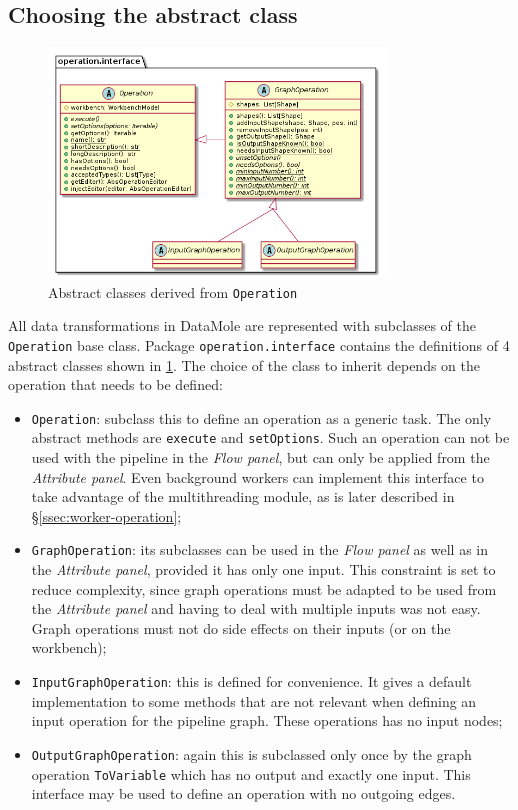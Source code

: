 \subsection{Choosing the abstract class}
\begin{figure}
	\centering
	\includegraphics[width=0.8\textwidth]{../uml/operation}
	\caption{Abstract classes derived from \texttt{Operation}}
	\label{fig:operationuml-dev}
\end{figure}
All data transformations in DataMole are represented with subclasses of the \texttt{Operation} base class. Package \texttt{operation.interface} contains the definitions of 4 abstract classes shown in \cref{fig:operationuml-dev}. 
The choice of the class to inherit depends on the operation that needs to be defined:
\begin{itemize}
	\item \texttt{Operation}: subclass this to define an operation as a generic task. The only abstract methods are \texttt{execute} and \texttt{setOptions}. Such an operation can not be used with the pipeline in the \textit{Flow panel}, but can only be applied from the \textit{Attribute panel}. Even background workers can implement this interface to take advantage of the multithreading module, as is later described in §\ref{ssec:worker-operation};
	\item \texttt{GraphOperation}: its subclasses can be used in the \textit{Flow panel} as well as in the \textit{Attribute panel}, provided it has only one input. This constraint is set to reduce complexity, since graph operations must be adapted to be used from the \textit{Attribute panel} and having to deal with multiple inputs was not easy.\\
	Graph operations must not do side effects on their inputs (or on the workbench);
	\item \texttt{InputGraphOperation}: this is defined for convenience. It gives a default implementation to some methods that are not relevant when defining an input operation for the pipeline graph. These operations has no input nodes;
	\item \texttt{OutputGraphOperation}: again this is subclassed only once by the graph operation \texttt{ToVariable} which has no output and exactly one input. This interface may be used to define an operation with no outgoing edges.
\end{itemize}
